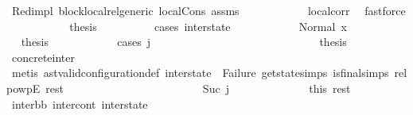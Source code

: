 \begin{isabellebody}
\ Red{\isacharunderscore}{\kern0pt}impl\ block{\isacharunderscore}{\kern0pt}local{\isacharunderscore}{\kern0pt}rel{\isacharunderscore}{\kern0pt}generic\ local{\isachardot}{\kern0pt}Cons\ assms\isanewline
\ \ \ \ \ \ \ \ \ \ \isamarkupfalse%
\ local{\isacharunderscore}{\kern0pt}corr\ \isamarkupfalse%
\ fastforce\isanewline
\isanewline
\ \ \ \ \ \ \ \ \isamarkupfalse%
\ \isamarkupfalse%
\ {\isacharquery}{\kern0pt}thesis\isanewline
\ \ \ \ \ \ \ \ \isamarkupfalse%
\ {\isacharparenleft}{\kern0pt}cases\ inter{\isacharunderscore}{\kern0pt}state{\isacharparenright}{\kern0pt}\isanewline
\ \ \ \ \ \ \ \ \ \ \isamarkupfalse%
\ {\isacharparenleft}{\kern0pt}Normal\ x{}{\isacharparenright}{\kern0pt}\isanewline
\ \ \ \ \ \ \ \ \ \ \isamarkupfalse%
\ \isamarkupfalse%
\ {\isacharquery}{\kern0pt}thesis\isanewline
\ \ \ \ \ \ \ \ \ \ \isamarkupfalse%
\ {\isacharparenleft}{\kern0pt}cases\ j{\isacharprime}{\kern0pt}{\isacharparenright}{\kern0pt}\isanewline
\ \ \ \ \ \ \ \ \ \ \ \ \isamarkupfalse%
\ {}\isanewline
\ \ \ \ \ \ \ \ \ \ \ \ \isamarkupfalse%
\ \isamarkupfalse%
\ {\isacharquery}{\kern0pt}thesis\ \isamarkupfalse%
\ concrete{\isacharunderscore}{\kern0pt}inter\ \isanewline
\ \ \ \ \ \ \ \ \ \ \ \ \ \ \isamarkupfalse%
\ {\isacharparenleft}{\kern0pt}metis\ ast{\isacharunderscore}{\kern0pt}valid{\isacharunderscore}{\kern0pt}configuration{\isacharunderscore}{\kern0pt}def\ {\isacartoucheopen}inter{\isacharunderscore}{\kern0pt}state\ {\isasymnoteq}\ Failure{\isacartoucheclose}\ get{\isacharunderscore}{\kern0pt}state{\isachardot}{\kern0pt}simps\ is{\isacharunderscore}{\kern0pt}final{\isachardot}{\kern0pt}simps{\isacharparenleft}{\kern0pt}{}{\isacharparenright}{\kern0pt}\ relpowp{\isacharunderscore}{\kern0pt}{}{\isacharunderscore}{\kern0pt}E\ rest{\isacharparenright}{\kern0pt}\isanewline
\ \ \ \ \ \ \ \ \ \ \isamarkupfalse%
\isanewline
\ \ \ \ \ \ \ \ \ \ \ \ \isamarkupfalse%
\ {\isacharparenleft}{\kern0pt}Suc\ j{\isacharprime}{\kern0pt}{\isacharprime}{\kern0pt}{\isacharparenright}{\kern0pt}\isanewline
\ \ \ \ \ \ \ \ \ \ \ \ \isamarkupfalse%
\ this\ rest\ \isamarkupfalse%
\ inter{\isacharunderscore}{\kern0pt}bb{}\ inter{\isacharunderscore}{\kern0pt}cont{}\ inter{\isacharunderscore}{\kern0pt}state{}\ \isanewline

\end{isabellebody}
